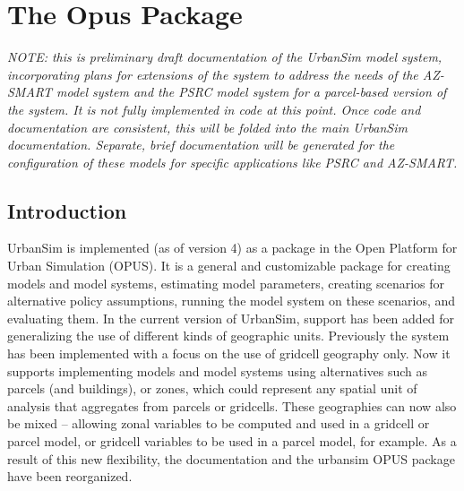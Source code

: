 
\chapter{The  Opus Package}

\emph{NOTE: this is preliminary draft documentation of the UrbanSim model system, incorporating
plans for extensions of the system to address the needs of the AZ-SMART model system and 
the PSRC model system for a parcel-based version of the system.  It is not fully implemented in 
code at this point.  Once code and
documentation are consistent, this will be folded into the main UrbanSim documentation.  Separate, 
brief documentation will be generated for the configuration of these models for specific
applications like PSRC and AZ-SMART.}

\section{Introduction}

UrbanSim is implemented (as of version 4) as a package in the Open Platform for Urban Simulation (OPUS).
It is a general and customizable package for creating models and model systems, estimating model
parameters, creating scenarios for alternative policy assumptions, running the model system on these
scenarios, and evaluating them.  In the current version of UrbanSim, support has been added for 
generalizing the use of different kinds of geographic units.  Previously the system has been implemented
with a focus on the use of gridcell geography only.  Now it supports implementing models and model
systems using alternatives such as parcels (and buildings), or zones, which could represent any spatial
unit of analysis that aggregates from parcels or gridcells.  These geographies can now also be mixed -- 
allowing zonal variables to be computed and used in a gridcell or parcel model, or gridcell variables to be
used in a parcel model, for example.  As a result of this new flexibility, the documentation and the urbansim 
OPUS package have been reorganized.

